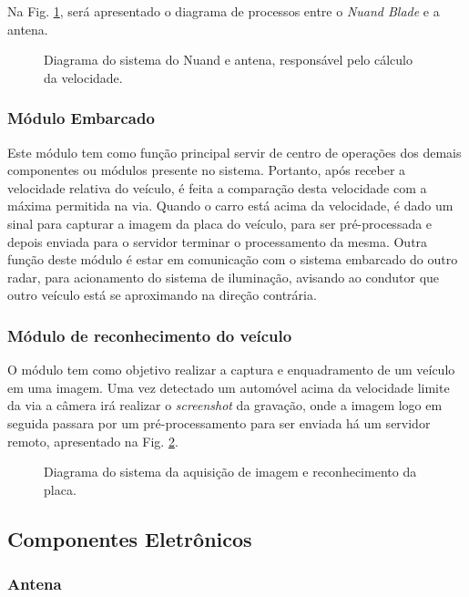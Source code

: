 Na Fig. \ref{fig:nuand}, será apresentado o diagrama de processos entre o \emph{Nuand Blade} e a antena.

 \begin{figure}[!htb]
	\caption{\label{fig:nuand} Diagrama do sistema do Nuand e antena, responsável pelo cálculo da velocidade.}
\end{figure}

\subsubsection{Módulo Embarcado}

Este módulo tem como função principal servir de centro de operações dos demais componentes ou módulos presente no sistema. Portanto, após receber a velocidade relativa do veículo, é feita a comparação desta velocidade com a máxima permitida na via. Quando o carro está acima da velocidade, é dado um sinal para capturar a imagem da placa do veículo, para ser pré-processada e depois enviada para o servidor terminar o processamento da mesma. Outra função deste módulo é estar em comunicação com o sistema embarcado do outro radar, para acionamento do sistema de iluminação, avisando ao condutor que outro veículo está se aproximando na direção contrária.



\subsubsection{Módulo de reconhecimento do veículo}
 O módulo tem como objetivo realizar a captura e enquadramento de um veículo em uma imagem. Uma vez detectado um automóvel acima da velocidade limite da via a câmera irá realizar o \textit{screenshot} da gravação, onde a imagem logo em seguida passara por um pré-processamento para ser enviada há um servidor remoto, apresentado na Fig. \ref{fig:processos}.
 
 \begin{figure}[!htb]
	\caption{\label{fig:processos} Diagrama do sistema da aquisição de imagem e reconhecimento da placa.}
\end{figure}
\subsection{Componentes Eletrônicos}

\subsubsection{Antena}


